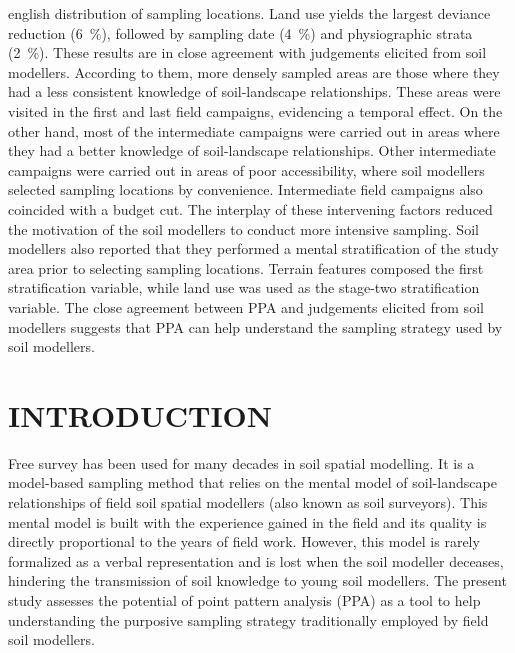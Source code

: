 \begin{chapterabstract}{english}{\enkeys}
distribution of sampling locations. Land use yields the largest deviance reduction (\SI{6}{\percent}), followed
by sampling date (\SI{4}{\percent}) and physiographic strata (\SI{2}{\percent}). These results are in close 
agreement with judgements elicited from soil modellers. According to them, more densely sampled areas are 
those 
where they had a less consistent knowledge of soil-landscape relationships. These areas were visited in the 
first and last field campaigns, evidencing a temporal effect. On the other hand, most of the intermediate 
campaigns were carried out in areas where they had a better knowledge of soil-landscape relationships. Other 
intermediate campaigns were carried out in areas of poor accessibility, where soil modellers selected sampling 
locations by convenience. Intermediate field campaigns also coincided with a budget cut. The interplay of 
these 
intervening factors reduced the motivation of the soil modellers to conduct more intensive sampling. Soil 
modellers also reported that they performed a mental stratification of the study area prior to selecting 
sampling locations. Terrain features composed the first stratification variable, while land use was used as 
the 
stage-two stratification variable. The close agreement between PPA and judgements elicited from soil modellers 
suggests that PPA can help understand the sampling strategy used by soil modellers.
\end{chapterabstract}

\formatchapter

\section{INTRODUCTION}


Free survey has been used for many decades in soil spatial modelling. It is a model-based sampling method that 
relies on the mental model of soil-landscape relationships of field soil spatial modellers (also known as 
soil surveyors). This mental model is built with the experience gained in the field and its quality is 
directly 
proportional to the years of field work. However, this model is rarely formalized as a verbal representation 
and is lost when the soil modeller deceases, hindering the transmission of soil knowledge to young soil 
modellers. The present study assesses the potential of point pattern analysis (PPA) as a tool to help 
understanding the purposive sampling strategy traditionally employed by field soil modellers.

